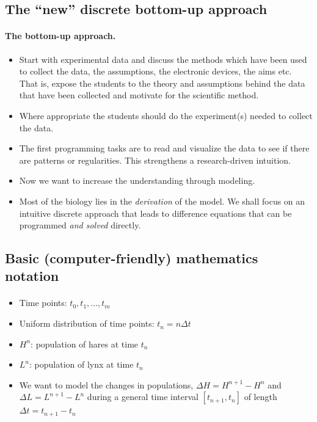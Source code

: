 \documentclass[%
oneside,                 %
final,                   %
10pt]{article}
\begin{document}
\subsection{The ``new'' discrete bottom-up approach}


\paragraph{The bottom-up approach.}
\begin{itemize}
 \item Start with experimental data and discuss the methods which have been used to collect the data, the assumptions, the electronic devices, the aims etc. That is, expose the students to the theory and assumptions behind the data that have been collected and motivate for the scientific method.

 \item Where appropriate the students should do the experiment(s) needed to collect the data.

 \item The first programming tasks are to read and visualize the data to see if there are patterns or regularities. This strengthens a research-driven intuition.

 \item Now we want to increase the understanding through modeling.

 \item Most of the biology lies in the \emph{derivation} of the model. We shall
   focus on an intuitive discrete approach that leads to difference
   equations that can be programmed \emph{and solved} directly.
\end{itemize}

\noindent



\subsection{Basic (computer-friendly) mathematics notation}

\paragraph{}
\begin{itemize}
 \item Time points: $t_0,t_1,\ldots,t_m$

 \item Uniform distribution of time points: $t_n=n\Delta t$

 \item $H^n$: population of hares at time $t_n$

 \item $L^n$: population of lynx at time $t_n$

 \item We want to model the changes in populations, $\Delta H=H^{n+1}-H^n$
   and $\Delta L=L^{n+1}-L^n$ during a general time interval $[t_{n+1},t_n]$
   of length $\Delta t=t_{n+1}-t_n$
\end{itemize}
\end{document}
